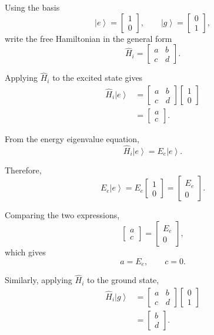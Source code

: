 \documentclass[12pt,a4paper]{article}
\newcommand{\ketg}{\left|g\right\rangle}
\newcommand{\kete}{\left|e\right\rangle}
\begin{document}
Using the basis
\[
\kete=
\begin{bmatrix}
1\\
0
\end{bmatrix},
\qquad
\ketg=
\begin{bmatrix}
0\\
1
\end{bmatrix},
\]
write the free Hamiltonian in the general form
\[
\hat H_i
=
\begin{bmatrix}
a&b\\
c&d
\end{bmatrix}.
\]



Applying \(\hat H_i\) to the excited state gives
\[
\begin{aligned}
\hat H_i\kete
&=
\begin{bmatrix}
a&b\\
c&d
\end{bmatrix}
\begin{bmatrix}
1\\
0
\end{bmatrix}\\
&=
\begin{bmatrix}
a\\
c
\end{bmatrix}.
\end{aligned}
\]

From the energy eigenvalue equation,
\[
\hat H_i\kete
=
E_e\kete.
\]

Therefore,
\[
E_e\kete
=
E_e
\begin{bmatrix}
1\\
0
\end{bmatrix}
=
\begin{bmatrix}
E_e\\
0
\end{bmatrix}.
\]

Comparing the two expressions,
\[
\begin{bmatrix}
a\\
c
\end{bmatrix}
=
\begin{bmatrix}
E_e\\
0
\end{bmatrix},
\]
which gives
\[
a=E_e,
\qquad
c=0.
\]

Similarly, applying \(\hat H_i\) to the ground state,
\[
\begin{aligned}
\hat H_i\ketg
&=
\begin{bmatrix}
a&b\\
c&d
\end{bmatrix}
\begin{bmatrix}
0\\
1
\end{bmatrix}\\
&=
\begin{bmatrix}
b\\
d
\end{bmatrix}.
\end{aligned}
\]
\end{document}
